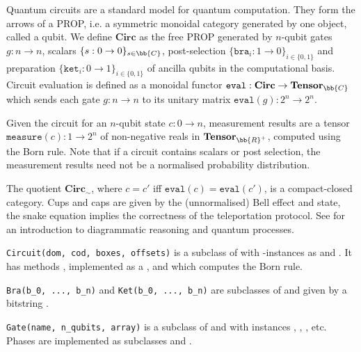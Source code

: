 
Quantum circuits are a standard model for quantum computation.
They form the arrows of a PROP, i.e. a symmetric monoidal category generated by one object, called a qubit.
We define $\mathbf{Circ}$ as the free PROP generated by
$n$-qubit gates $g : n \to n$,
scalars $\{s : 0 \to 0\}_{s \in \bb{C}}$,
post-selection $\{\mathtt{bra}_i : 1 \to 0\}_{i \in \{0, 1\}}$
and preparation $\{\mathtt{ket}_i : 0 \to 1\}_{i \in \{0, 1\}}$ of ancilla qubits in the computational basis.
Circuit evaluation is defined as a monoidal functor $\mathtt{eval} : \mathbf{Circ} \to \mathbf{Tensor}_\bb{C}$ which sends each gate $g : n \to n$ to its unitary matrix $\mathtt{eval}(g) : 2^n \to 2^n$.

Given the circuit for an $n$-qubit state $c : 0 \to n$, measurement results are a tensor $\mathtt{measure}(c) : 1 \to 2^n$ of non-negative reals in $\mathbf{Tensor}_{\bb{R}^+}$, computed using the Born rule.
Note that if a circuit contains scalars or post selection, the measurement results need not be a normalised probability distribution.

The quotient $\mathbf{Circ}_\sim$, where $c = c'$ iff $\mathtt{eval}(c) = \mathtt{eval}(c')$, is a compact-closed category.
Cups and caps are given by the (unnormalised) Bell effect and state, the snake equation implies the correctness of the teleportation protocol.
See \cite{CoeckeKissinger17} for an introduction to diagrammatic reasoning and quantum processes.

\begin{class}\normalfont\texttt{Circuit(dom, cod, boxes, offsets)}
is a subclass of  with -instances as  and . It has methods , implemented as a , and  which computes the Born rule.
\end{class}

\begin{class}\normalfont\texttt{Bra(b\_0, ..., b\_n)} and \normalfont\texttt{Ket(b\_0, ..., b\_n)} are
subclasses of  and  given by a bitstring .
\end{class}

\begin{class}\normalfont\texttt{Gate(name, n\_qubits, array)}
is a subclass of  and  with instances , , , etc. Phases are implemented as subclasses  and .
\end{class}

